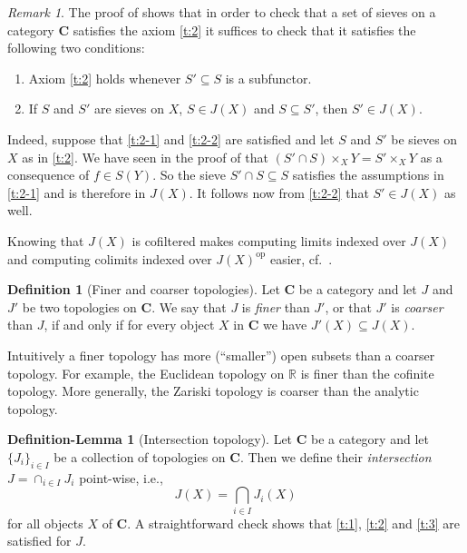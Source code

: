 \documentclass[12pt,reqno,a4paper]{amsart}
\theoremstyle{plain}
\theoremstyle{definition}
\newtheorem{defn}[thm]{Definition}
\newtheorem{defnlm}[thm]{Definition-Lemma}
\theoremstyle{remark}
\newtheorem{rem}[thm]{Remark}
\begin{document}
\begin{rem}\label{rem:t2}
  The proof of  shows that in order to check that a set of sieves on a category $\mathbf{C}$ satisfies the axiom \ref{t:2} it suffices to check that it satisfies the following two conditions:
  \begin{enumerate}[label=(T2)$_{\arabic*}$]
    \item Axiom \ref{t:2} holds whenever $S' \subseteq S$ is a subfunctor.\label{t:2-1}
    \item If $S$ and $S'$ are sieves on $X$, $S \in J(X)$ and $S \subseteq S'$, then $S' \in J(X)$.\label{t:2-2}
  \end{enumerate}
  Indeed, suppose that \ref{t:2-1} and \ref{t:2-2} are satisfied and let $S$ and $S'$ be sieves on $X$ as in \ref{t:2}.
  We have seen in the proof of  that $(S' \cap S) \times_{X} Y = S' \times_{X} Y$ as a consequence of $f \in S(Y)$.
  So the sieve $S' \cap S \subseteq S$ satisfies the assumptions in \ref{t:2-1} and is therefore in $J(X)$.
  It follows now from \ref{t:2-2} that $S' \in J(X)$ as well.
\end{rem}

Knowing that $J(X)$ is cofiltered makes computing limits indexed over $J(X)$ and computing colimits indexed over $J(X)^{\mathrm{op}}$ easier, cf.~\cite[\href{https://stacks.math.columbia.edu/tag/04AX}{Tag 04AX}]{stacks-project}.

\begin{defn}[Finer and coarser topologies]
  Let $\mathbf{C}$ be a category and let $J$ and $J'$ be two topologies on $\mathbf{C}$.
  We say that $J$ is \textit{finer} than $J'$, or that $J'$ is \textit{coarser} than $J$, if and only if for every object $X$ in $\mathbf{C}$ we have $J'(X) \subseteq J(X)$.
\end{defn}

Intuitively a finer topology has more (``smaller'') open subsets than a coarser topology.
For example, the Euclidean topology on $\mathbb{R}$ is finer than the cofinite topology.
More generally, the Zariski topology is coarser than the analytic topology.

\begin{defnlm}[Intersection topology]\label{defnlm:intersection}
  Let $\mathbf{C}$ be a category and let $\{ J_{i} \}_{i \in I}$ be a collection of topologies on $\mathbf{C}$.
  Then we define their \textit{intersection} $J = \cap_{i \in I} J_{i}$ point-wise, i.e.,
  \[ J(X) = \bigcap_{i \in I} J_{i}(X) \]
  for all objects $X$ of $\mathbf{C}$.
  A straightforward check shows that \ref{t:1}, \ref{t:2} and \ref{t:3} are satisfied for $J$.
\end{defnlm}
\end{document}
